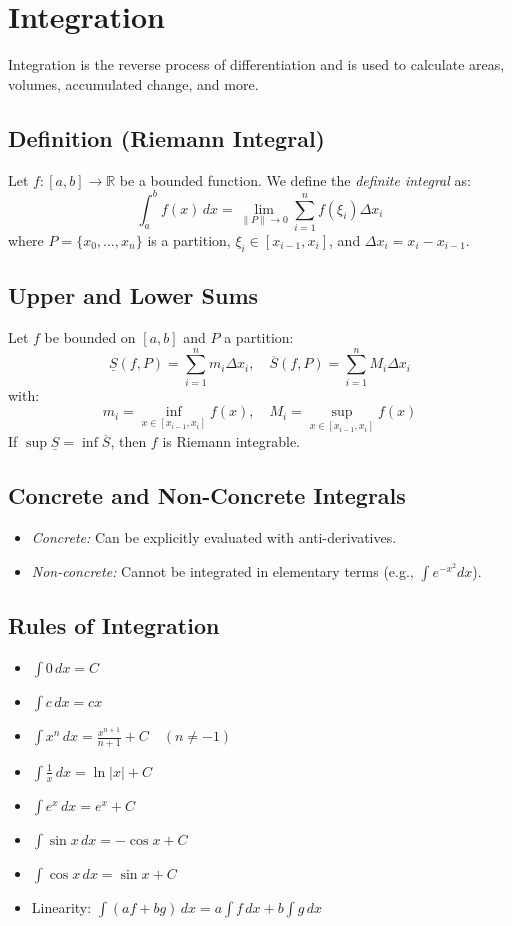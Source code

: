 \section{Integration}

Integration is the reverse process of differentiation and is used to calculate areas, volumes, accumulated change, and more.

\subsection{Definition (Riemann Integral)}

Let \(f: [a, b] \to \mathbb{R}\) be a bounded function. We define the \emph{definite integral} as:
\[
\int_a^b f(x)\,dx = \lim_{\|P\| \to 0} \sum_{i=1}^n f(\xi_i)\Delta x_i
\]
where \(P = \{x_0, \dots, x_n\}\) is a partition, \(\xi_i \in [x_{i-1}, x_i]\), and \(\Delta x_i = x_i - x_{i-1}\).

\subsection{Upper and Lower Sums}

Let \(f\) be bounded on \([a, b]\) and \(P\) a partition:
\[
\underline{S}(f, P) = \sum_{i=1}^n m_i \Delta x_i, \quad
\overline{S}(f, P) = \sum_{i=1}^n M_i \Delta x_i
\]
with:
\[
m_i = \inf_{x \in [x_{i-1}, x_i]} f(x), \quad
M_i = \sup_{x \in [x_{i-1}, x_i]} f(x)
\]
If \(\sup \underline{S} = \inf \overline{S}\), then \(f\) is Riemann integrable.

\subsection{Concrete and Non-Concrete Integrals}

\begin{itemize}[label=\(-\)]
\item \emph{Concrete:} Can be explicitly evaluated with anti-derivatives.
\item \emph{Non-concrete:} Cannot be integrated in elementary terms (e.g., \(\int e^{-x^2} dx\)).
\end{itemize}

\subsection{Rules of Integration}

\begin{itemize}[label=\(-\)]
\item \(\int 0\,dx = C\)
\item \(\int c\,dx = cx\)
\item \(\int x^n\,dx = \frac{x^{n+1}}{n+1} + C \quad (n \ne -1)\)
\item \(\int \frac{1}{x}\,dx = \ln|x| + C\)
\item \(\int e^x\,dx = e^x + C\)
\item \(\int \sin x\,dx = -\cos x + C\)
\item \(\int \cos x\,dx = \sin x + C\)
\item Linearity: \(\int (af + bg)\,dx = a\int f\,dx + b\int g\,dx\)
\end{itemize}

